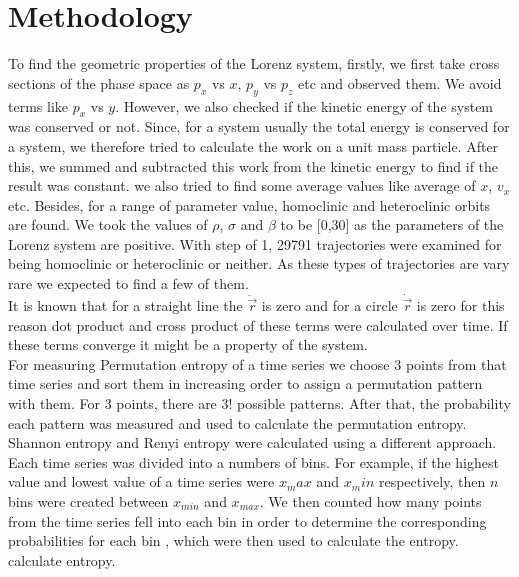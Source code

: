 \documentclass[%
reprint,
amsmath,amssymb,
aps,
floatfix,
]{revtex4-2}
\begin{document}
	\section{Methodology}
	To find the geometric properties of the Lorenz system, firstly, we first take cross sections of the phase space as $p_x$ vs $x$, $p_y$ vs $p_z$ etc and observed them. We avoid terms like $p_x$ vs $y$. However, we also checked if the kinetic energy of the system was conserved or not. Since, for a system usually the total energy is conserved for a system, we therefore tried to calculate the work on a unit mass particle. After this, we summed and subtracted this work from the kinetic energy to find if the result was constant.
	we also tried to find some average values like average of $x$, $v_x$ etc. Besides, for a range of parameter value, homoclinic and heteroclinic orbits are found. We took the values of $\rho$, $\sigma$ and $\beta$ to be [0,30] as the parameters of the Lorenz system are positive. With step of 1, 29791 trajectories were examined for being homoclinic or heteroclinic or neither. As these types of trajectories are vary rare we expected to find a few of them.\\
	It is known that for a straight line the $\ddot{\vec{r}}$ is zero and for a circle $\dot{\vec{r}}$ is zero for this reason dot product and cross product of these terms were calculated over time. If these terms converge it might be a property of the system.\\
	For measuring Permutation entropy of a time series we choose $3$ points from that time series and sort them in increasing order to assign a permutation pattern with them. For 3 points, there are $3!$ possible patterns. After that, the probability each pattern was measured and used to calculate the permutation entropy. \\
	Shannon entropy and Renyi entropy were calculated using a different approach. Each time series was divided into a numbers of bins. For example, if the highest value and lowest value of a time series were $x_max$ and $x_min$ respectively, then $n$ bins were created between $x_{min}$ and $x_{max}$. We then counted how many points from the time series fell into each bin in order to determine the corresponding probabilities for each bin , which were then used to calculate the entropy. calculate entropy.
	
\end{document}

